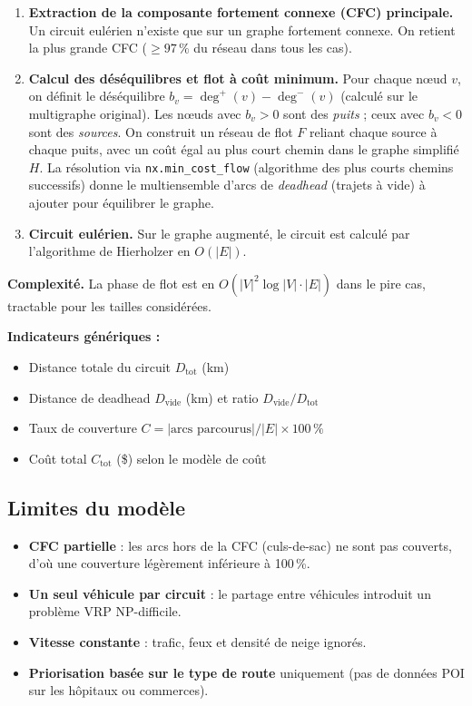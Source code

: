 \documentclass[11pt,a4paper]{article}
\begin{document}
\begin{enumerate}
  \item \textbf{Extraction de la composante fortement connexe (CFC) principale.}
    Un circuit eul\'erien n'existe que sur un graphe fortement connexe.
    On retient la plus grande CFC ($\geq 97\,\%$ du r\'eseau dans tous les cas).

  \item \textbf{Calcul des d\'es\'equilibres et flot \`a co\^ut minimum.}
    Pour chaque n\oe ud $v$, on d\'efinit le d\'es\'equilibre
    $b_v = \deg^+(v) - \deg^-(v)$ (calculé sur le multigraphe original).
    Les n\oe uds avec $b_v > 0$ sont des \textit{puits} ;
    ceux avec $b_v < 0$ sont des \textit{sources}.
    On construit un r\'eseau de flot $F$ reliant chaque source \`a chaque puits,
    avec un co\^ut \'egal au plus court chemin dans le graphe simplifi\'e $H$.
    La r\'esolution via \texttt{nx.min\_cost\_flow} (algorithme des plus courts
    chemins successifs) donne le multiensemble d'arcs de \textit{deadhead}
    (trajets \`a vide) \`a ajouter pour \'equilibrer le graphe.

  \item \textbf{Circuit eul\'erien.}
    Sur le graphe augment\'e, le circuit est calcul\'e par l'algorithme de
    Hierholzer en $O(|E|)$.
\end{enumerate}

\noindent\textbf{Complexit\'e.}
La phase de flot est en $O(|V|^2 \log|V| \cdot |E|)$ dans le pire cas,
tractable pour les tailles consid\'er\'ees.

\medskip
\noindent\textbf{Indicateurs g\'en\'eriques :}
\begin{itemize}
  \item Distance totale du circuit $D_{\text{tot}}$ (km)
  \item Distance de deadhead $D_{\text{vide}}$ (km) et ratio $D_{\text{vide}}/D_{\text{tot}}$
  \item Taux de couverture $C = |\text{arcs parcourus}| / |E| \times 100\,\%$
  \item Co\^ut total $C_{\text{tot}}$ (\$) selon le mod\`ele de co\^ut
\end{itemize}

\subsection{Limites du mod\`ele}

\begin{itemize}
  \item \textbf{CFC partielle} : les arcs hors de la CFC (culs-de-sac) ne sont
    pas couverts, d'o\`u une couverture l\'eg\`erement inf\'erieure \`a 100\,\%.
  \item \textbf{Un seul v\'ehicule par circuit} : le partage entre v\'ehicules
    introduit un probl\`eme VRP NP-difficile.
  \item \textbf{Vitesse constante} : trafic, feux et densit\'e de neige ignor\'es.
  \item \textbf{Priorisation bas\'ee sur le type de route} uniquement (pas de
    donn\'ees POI sur les h\^opitaux ou commerces).
\end{itemize}
\end{document}
